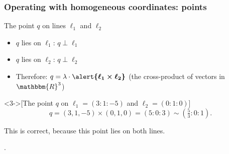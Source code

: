 \documentclass{beamer}
\newcommand{\RR}{\mathbbm{R}}
\newcommand{\yellowtext}[1]{\mbox{\color{yellow}#1}}
\begin{document}
\begin{frame}
  \frametitle{Operating with homogeneous coordinates: \yellowtext{points}}

  \begin{block}{The point $q$ on lines $\ell_1$ and $\ell_2$}
    \begin{itemize}
    \item $q$ lies on $\ell_1$: \qquad $q\perp\ell_1$
    \item $q$ lies on $\ell_2$: \qquad $q\perp\ell_2$
    \item<2-> \alert{Therefore:} $q = \lambda \cdot
      \boldsymbol{\alert{\ell_1\times \ell_2}}$  \quad (the cross-product of
      vectors in $\RR^3$) 
    \end{itemize}
  \end{block}

  \begin{example}<3->[\small The point $q$ on $\ell_1=(3:1:-5)$ and
    $\ell_2=(0:1:0)$] 
    $$q = (3,1,-5)\times(0,1,0) = (5:0:3) \sim (\tfrac{5}{3}:0:1).$$

    This is correct, because this point lies on both lines.

    \medskip
    .
  \end{example}

\end{frame}
\end{document}
